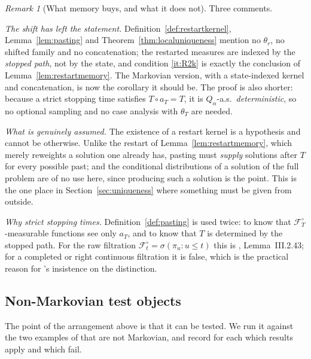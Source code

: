 \documentclass[11pt,a4paper]{article}
\theoremstyle{plain}
\theoremstyle{definition}
\theoremstyle{remark}
\newtheorem{remark}[theorem]{Remark}
\newcommand{\Filt}{\mathcal{F}}
\newcommand{\CPS}{\cite{CPS23}}
\newcommand{\JS}{\cite{JS03}}
\begin{document}
\begin{remark}[What memory buys, and what it does not]
  \label{rem:pastingassumed}
  \label{rem:localuniqcomment}
  Three comments.

  \emph{The shift has left the statement.}  Definition~\ref{def:restartkernel},
  Lemma~\ref{lem:pasting} and Theorem~\ref{thm:localuniqueness} mention no
  $\theta_r$, no shifted family and no concatenation; the restarted measures are
  indexed by the \emph{stopped path}, not by the state, and condition
  \ref{it:R2k} is exactly the conclusion of Lemma~\ref{lem:restartmemory}.  The
  Markovian version, with a state-indexed kernel and concatenation, is now the
  corollary it should be.  The proof is also shorter: because a strict stopping
  time satisfies $T \circ a_T = T$, it is $Q_\alpha$-a.s.\ \emph{deterministic},
  so no optional sampling and no case analysis with $\theta_T$ are needed.

  \emph{What is genuinely assumed.}  The existence of a restart kernel is a
  hypothesis and cannot be otherwise.  Unlike the restart of
  Lemma~\ref{lem:restartmemory}, which merely reweights a solution one already
  has, pasting must \emph{supply} solutions after $T$ for every possible past;
  and the conditional distributions of a solution of the full problem are of no
  use here, since producing such a solution is the point.  This is the one place
  in Section~\ref{sec:uniqueness} where something must be given from outside.

  \emph{Why strict stopping times.}  Definition~\ref{def:pasting} is used twice:
  to know that $\Filt^\circ_T$-measurable functions see only $a_T$, and to know
  that $T$ is determined by the stopped path.  For the raw filtration
  $\Filt^\circ_t = \sigma(\pi_u : u \leq t)$ this is \JS, Lemma~III.2.43; for a
  completed or right continuous filtration it is false, which is the practical
  reason for \JS's insistence on the distinction.
\end{remark}

\subsection{Non-Markovian test objects}
\label{ssec:testobjects}

The point of the arrangement above is that it can be tested.  We run it against
the two examples of \CPS{} that are not Markovian, and record for each which
results apply and which fail.
\end{document}
